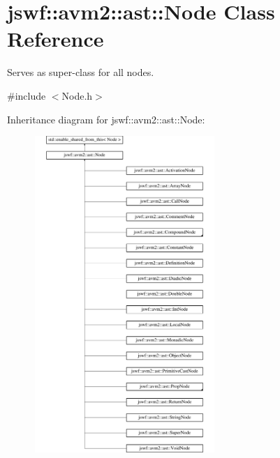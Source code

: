 \hypertarget{classjswf_1_1avm2_1_1ast_1_1_node}{\section{jswf\+:\+:avm2\+:\+:ast\+:\+:Node Class Reference}
\label{classjswf_1_1avm2_1_1ast_1_1_node}
}


Serves as super-\/class for all nodes.  




{\ttfamily \#include $<$Node.\+h$>$}

Inheritance diagram for jswf\+:\+:avm2\+:\+:ast\+:\+:Node\+:\begin{figure}[H]
\begin{center}
\leavevmode
\includegraphics[height=12.000000cm]{classjswf_1_1avm2_1_1ast_1_1_node}
\end{center}
\end{figure}
